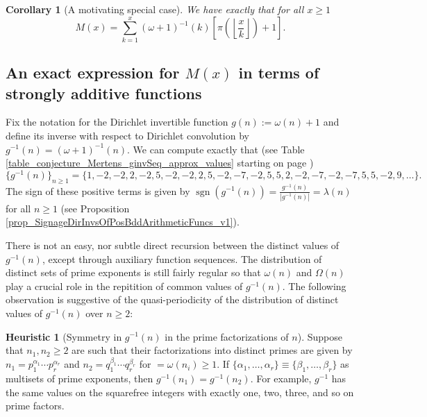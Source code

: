 \documentclass[11pt,reqno,a4letter]{article}
\numberwithin{figure}{section}
\numberwithin{table}{section}
\newcommand{\Floor}[2]{\ensuremath{\left\lfloor \frac{#1}{#2} \right\rfloor}}
\theoremstyle{plain}
\newtheorem{cor}[theorem]{Corollary}
\numberwithin{theorem}{section}
\theoremstyle{definition}
\newtheorem{heuristic}[theorem]{Heuristic}
\begin{document}
\begin{cor}[A motivating special case] 
\label{cor_Mx_gInvnPixk_formula} 
We have exactly that for all $x \geq 1$ 
\begin{equation} 
\label{eqn_Mx_gInvnPixk_formula} 
M(x) = \sum_{k=1}^{x} (\omega+1)^{-1}(k) \left[\pi\left(\Floor{x}{k}\right) + 1\right]. 
\end{equation} 
\end{cor} 

\subsection{An exact expression for $M(x)$ in terms of strongly additive functions} 
\label{example_InvertingARecRelForMx_Intro}

Fix the notation for the Dirichlet invertible function $g(n) := \omega(n) + 1$ and define its 
inverse with respect to Dirichlet convolution by $g^{-1}(n) = (\omega+1)^{-1}(n)$. 
We can compute exactly that 
(see Table \ref{table_conjecture_Mertens_ginvSeq_approx_values} starting on page 
\pageref{table_conjecture_Mertens_ginvSeq_approx_values}) 
\[
\{g^{-1}(n)\}_{n \geq 1} = \{1, -2, -2, 2, -2, 5, -2, -2, 2, 5, -2, -7, -2, 5, 5, 2, -2, -7, -2, 
     -7, 5, 5, -2, 9, \ldots \}. 
\] 
The sign of these positive terms is given by 
$\operatorname{sgn}(g^{-1}(n)) = \frac{g^{-1}(n)}{|g^{-1}(n)|} = \lambda(n)$ for all $n \geq 1$ 
(see Proposition \ref{prop_SignageDirInvsOfPosBddArithmeticFuncs_v1}). 

There is not an easy, nor subtle 
direct recursion between the distinct values of $g^{-1}(n)$, except through auxiliary function sequences. 
The distribution of distinct sets of prime exponents is still fairly regular so that 
$\omega(n)$ and $\Omega(n)$ play a crucial role in the repitition of common values of 
$g^{-1}(n)$. 
The following observation is suggestive of the quasi-periodicity of the distribution of 
distinct values of $g^{-1}(n)$ over $n \geq 2$: 

\begin{heuristic}[Symmetry in $g^{-1}(n)$ in the prime factorizations of $n$] 
Suppose that $n_1, n_2 \geq 2$ are such that their factorizations into distinct primes are 
given by $n_1 = p_1^{\alpha_1} \cdots p_r^{\alpha_r}$ and $n_2 = q_1^{\beta_1} \cdots q_r^{\beta_r}$ 
for $ = \omega(n_i) \geq 1$. 
If $\{\alpha_1, \ldots, \alpha_r\} \equiv \{\beta_1, \ldots, \beta_r\}$ as multisets of prime exponents, 
then $g^{-1}(n_1) = g^{-1}(n_2)$. For example, $g^{-1}$ has the same values on the squarefree integers 
with exactly one, two, three, and so on prime factors.  
\end{heuristic} 
\end{document}
